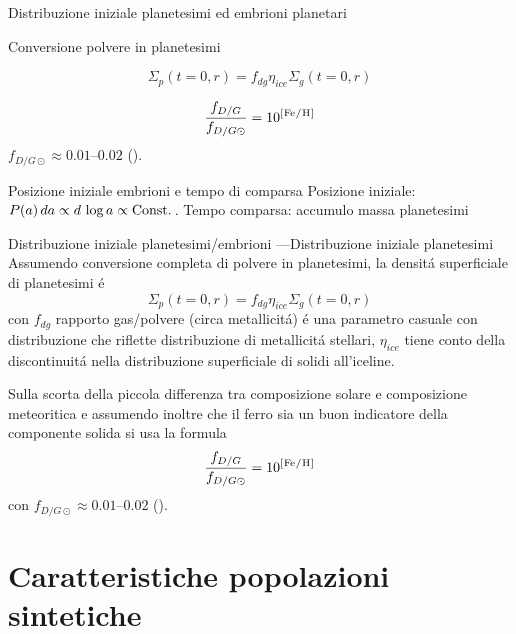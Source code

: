 \begin{frame}{Distribuzione iniziale planetesimi ed embrioni planetari}
\begin{block}{Conversione polvere in planetesimi}

	\begin{equation*}
	\Sigma_p(t=0,r)=f_{dg}\eta_{ice}\Sigma_g(t=0,r)
	\end{equation*}
	
	\begin{equation*}
	\frac{f_{D/G}}{f_{D/G\odot}}=10\expy{[\cel{Fe}{}{}{}/\cel{H}{}{}{}]}
	\end{equation*}
	$f_{D/G\odot}\approx\numrange{0.01}{0.02}$ (\cite{lodders2003solar}).
\end{block}
\begin{block}{Posizione iniziale embrioni e tempo di comparsa}
Posizione iniziale: $P(a)\,da\propto d\,\log{a}\propto\operatorname{Const.}{}$.
Tempo comparsa: accumulo massa planetesimi

\end{block}
\end{frame}

\begin{wordonframe}{Distribuzione iniziale planetesimi/embrioni}
---Distribuzione iniziale planetesimi
Assumendo conversione completa di polvere in planetesimi, la densit\'a superficiale di planetesimi \'e
\begin{equation}
\Sigma_p(t=0,r)=f_{dg}\eta_{ice}\Sigma_g(t=0,r)
\end{equation}
con $f_{dg}$ rapporto gas/polvere (circa metallicit\'a) \'e una parametro casuale con distribuzione che riflette distribuzione di metallicit\'a stellari, $\eta_{ice}$ tiene conto della discontinuit\'a nella distribuzione superficiale di solidi all'iceline.

Sulla scorta della piccola differenza tra composizione solare e composizione meteoritica e assumendo inoltre che il ferro sia un buon indicatore della componente solida  si usa la formula
\begin{equation}
\frac{f_{D/G}}{f_{D/G\odot}}=10\expy{[\cel{Fe}{}{}{}/\cel{H}{}{}{}]}
\end{equation}
con $f_{D/G\odot}\approx\numrange{0.01}{0.02}$ (\cite{lodders2003solar}).
\end{wordonframe}

\section{Caratteristiche popolazioni sintetiche}


